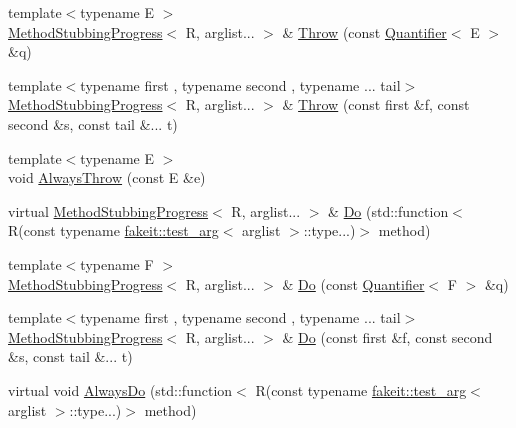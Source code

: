 \begin{DoxyCompactItemize}
\item 
{\footnotesize template$<$typename E $>$ }\\\mbox{\hyperlink{structfakeit_1_1MethodStubbingProgress}{Method\+Stubbing\+Progress}}$<$ R, arglist... $>$ \& \mbox{\hyperlink{structfakeit_1_1MethodStubbingProgress_a93c74210adfc0ec4662aff15f78834c7}{Throw}} (const \mbox{\hyperlink{structfakeit_1_1Quantifier}{Quantifier}}$<$ E $>$ \&q)
\item 
{\footnotesize template$<$typename first , typename second , typename ... tail$>$ }\\\mbox{\hyperlink{structfakeit_1_1MethodStubbingProgress}{Method\+Stubbing\+Progress}}$<$ R, arglist... $>$ \& \mbox{\hyperlink{structfakeit_1_1MethodStubbingProgress_a516a0ade529c61e4ab6df1bf47f3f1b2}{Throw}} (const first \&f, const second \&s, const tail \&... t)
\item 
{\footnotesize template$<$typename E $>$ }\\void \mbox{\hyperlink{structfakeit_1_1MethodStubbingProgress_a4efb736b0529123d9c5ed87630e11ac2}{Always\+Throw}} (const E \&e)
\item 
virtual \mbox{\hyperlink{structfakeit_1_1MethodStubbingProgress}{Method\+Stubbing\+Progress}}$<$ R, arglist... $>$ \& \mbox{\hyperlink{structfakeit_1_1MethodStubbingProgress_a9ef4c2db8e567aa312b708613d240ae1}{Do}} (std\+::function$<$ R(const typename \mbox{\hyperlink{structfakeit_1_1test__arg}{fakeit\+::test\+\_\+arg}}$<$ arglist $>$\+::type...)$>$ method)
\item 
{\footnotesize template$<$typename F $>$ }\\\mbox{\hyperlink{structfakeit_1_1MethodStubbingProgress}{Method\+Stubbing\+Progress}}$<$ R, arglist... $>$ \& \mbox{\hyperlink{structfakeit_1_1MethodStubbingProgress_a59f9d7ab7c86b809ce25b41d05b58ad2}{Do}} (const \mbox{\hyperlink{structfakeit_1_1Quantifier}{Quantifier}}$<$ F $>$ \&q)
\item 
{\footnotesize template$<$typename first , typename second , typename ... tail$>$ }\\\mbox{\hyperlink{structfakeit_1_1MethodStubbingProgress}{Method\+Stubbing\+Progress}}$<$ R, arglist... $>$ \& \mbox{\hyperlink{structfakeit_1_1MethodStubbingProgress_a157561400e37da65c5b48f4466fc603c}{Do}} (const first \&f, const second \&s, const tail \&... t)
\item 
virtual void \mbox{\hyperlink{structfakeit_1_1MethodStubbingProgress_a47464ab35cb06c00dbd00a13328b80a7}{Always\+Do}} (std\+::function$<$ R(const typename \mbox{\hyperlink{structfakeit_1_1test__arg}{fakeit\+::test\+\_\+arg}}$<$ arglist $>$\+::type...)$>$ method)

\end{DoxyCompactItemize}
